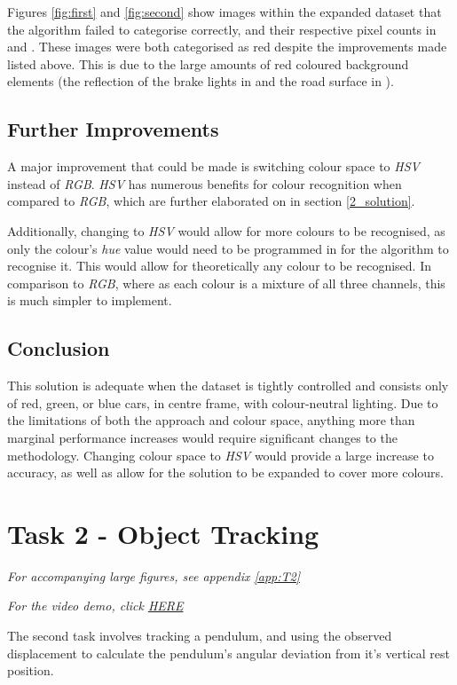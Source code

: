 \documentclass[conference]{IEEEtran}
\begin{document}
Figures \ref{fig:first} and \ref{fig:second} show images within the expanded dataset that the algorithm failed to categorise correctly, and their respective pixel counts in  and . These images were both categorised as red despite the improvements made listed above. This is due to the large amounts of red coloured background elements (the reflection of the brake lights in  and the road surface in ).


\subsection{Further Improvements} \label{sec:further1}
A major improvement that could be made is switching colour space to \textit{HSV} instead of \textit{RGB}. \textit{HSV} has numerous benefits for colour recognition when compared to \textit{RGB}, which are further elaborated on in section \ref{2_solution}.

Additionally, changing to \textit{HSV} would allow for more colours to be recognised, as only the colour's \textit{hue} value would need to be programmed in for the algorithm to recognise it. This would allow for theoretically any colour to be recognised. In comparison to \textit{RGB}, where as each colour is a mixture of all three channels, this is much simpler to implement.
\subsection{Conclusion}
This solution is adequate when the dataset is tightly controlled and consists only of red, green, or blue cars, in centre frame, with colour-neutral lighting. Due to the limitations of both the approach and colour space, anything more than marginal performance increases would require significant changes to the methodology. Changing colour space to \textit{HSV} would provide a large increase to accuracy, as well as allow for the solution to be expanded to cover more colours.

\section{Task 2 - Object Tracking}
\textit{For accompanying large figures, see appendix \ref{app:T2}}

\textit{For the video demo, click \href{https://youtu.be/kW5fbNTTovo}{HERE}}

The second task involves tracking a pendulum, and using the observed displacement to calculate the pendulum's angular deviation from it's vertical rest position.
\end{document}
